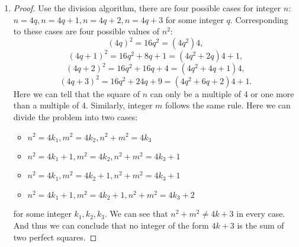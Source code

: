 \documentclass[11pt,a4paper]{article}
\begin{document}
\begin{enumerate}
	\item \begin{proof}Use the division algorithm, there are four possible cases for integer $n$: $n=4q,n=4q+1,n=4q+2,n=4q+3$ for some integer $q$. Corresponding to these cases are four possible values of $n^2$:\[(4q)^2= 16q^2= (4q^2)4,\] \[(4q + 1)^2= 16q^2+ 8q + 1 = (4q^2+ 2q)4 + 1,\] \[(4q + 2)^2= 16q^2+ 16q + 4 = (4q^2+ 4q + 1)4,\] \[(4q + 3)^2= 16q^2+ 24q + 9 = (4q^2+ 6q + 2)4 + 1.\] Here we can tell that the square of $n$ can only be a multiple of 4 or one more than a multiple of 4. Similarly, integer $m$ follows the same rule. Here we can divide the problem into two cases:
	\begin{itemize}
		\item $n^2=4k_1, m^2=4k_2, n^2+m^2=4k_3$
		\item $n^2=4k_1+1, m^2=4k_2, n^2+m^2=4k_3+1$
		\item $n^2=4k_1, m^2=4k_2+1, n^2+m^2=4k_3+1$
		\item $n^2=4k_1+1, m^2=4k_2+1, n^2+m^2=4k_3+2$
	\end{itemize}
	for some integer $k_1, k_2, k_3$.
	We can see that $n^2+m^2 \neq 4k+3$ in every case. And thus we can conclude that no integer of the form $4k+3$ is the sum of two perfect squares. \end{proof}

\end{enumerate}
\end{document}
